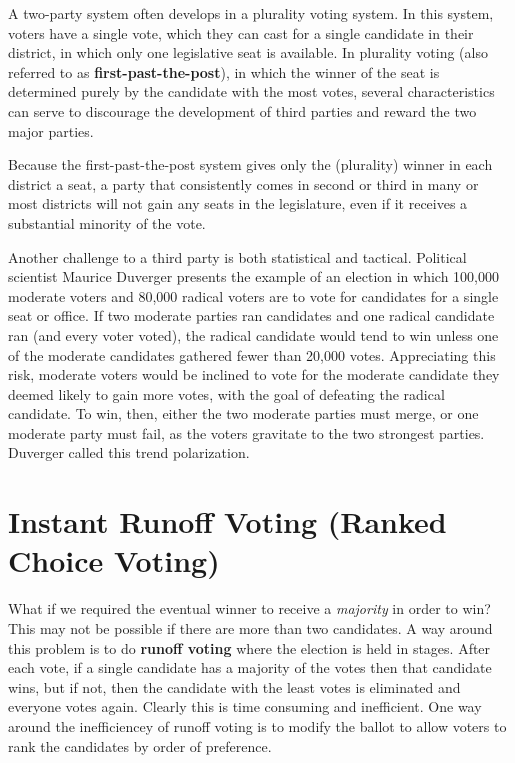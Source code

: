 A two-party system often develops in a plurality voting system. In
this system, voters have a single vote, which they can cast for a
single candidate in their district, in which only one legislative seat
is available. In plurality voting (also referred to as
\textbf{first-past-the-post}), in which the winner of the seat is
determined purely by the candidate with the most votes, several
characteristics can serve to discourage the development of third
parties and reward the two major parties.

Because the first-past-the-post system gives only the (plurality)
winner in each district a seat, a party that consistently comes in
second or third in many or most districts will not gain any seats in
the legislature, even if it receives a substantial minority of the
vote.

Another challenge to a third party is both statistical and tactical.
Political scientist Maurice Duverger presents the example of an
election in which 100,000 moderate voters and 80,000 radical voters
are to vote for candidates for a single seat or office. If two
moderate parties ran candidates and one radical candidate ran (and
every voter voted), the radical candidate would tend to win unless one
of the moderate candidates gathered fewer than 20,000 votes.
Appreciating this risk, moderate voters would be inclined to vote for
the moderate candidate they deemed likely to gain more votes, with the
goal of defeating the radical candidate. To win, then, either the two
moderate parties must merge, or one moderate party must fail, as the
voters gravitate to the two strongest parties. Duverger called this
trend polarization.

\section{Instant Runoff Voting (Ranked Choice Voting)}%
\label{sec:irv}

What if we required the eventual winner to receive a \emph{majority}
in order to win? This may not be possible if there are more than two
candidates. A way around this problem is to do \textbf{runoff voting}
where the election is held in stages. After each vote, if a single
candidate has a majority of the votes then that candidate wins, but if
not, then the candidate with the least votes is eliminated and
everyone votes again. Clearly this is time consuming and inefficient.
One way around the inefficiencey of runoff voting is to modify the
ballot to allow voters to rank the candidates by order of preference.

